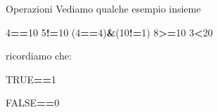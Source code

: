 \documentclass[
  ignorenonframetext,
]{beamer}
\newenvironment{Shaded}{\begin{snugshade}}{\end{snugshade}}
\newcommand{\DecValTok}[1]{\textcolor[rgb]{0.00,0.00,0.81}{#1}}
\newcommand{\NormalTok}[1]{#1}
\newcommand{\OperatorTok}[1]{\textcolor[rgb]{0.81,0.36,0.00}{\textbf{#1}}}
\newcommand{\OtherTok}[1]{\textcolor[rgb]{0.56,0.35,0.01}{#1}}
\begin{document}
\begin{frame}[fragile]{Operazioni}
\protect\hypertarget{operazioni-1}{}
Vediamo qualche esempio insieme

\begin{Shaded}
\begin{Highlighting}[]
\DecValTok{4}\OperatorTok{==}\DecValTok{10}
\DecValTok{5}\OperatorTok{!=}\DecValTok{10}
\NormalTok{(}\DecValTok{4}\OperatorTok{==}\DecValTok{4}\NormalTok{)}\OperatorTok{\&}\NormalTok{(}\DecValTok{10}\OperatorTok{!=}\DecValTok{1}\NormalTok{)}
\DecValTok{8}\OperatorTok{\textgreater{}=}\DecValTok{10}
\DecValTok{3}\OperatorTok{\textless{}}\DecValTok{20}
\end{Highlighting}
\end{Shaded}

ricordiamo che:

\begin{Shaded}
\begin{Highlighting}[]
\OtherTok{TRUE}\OperatorTok{==}\DecValTok{1}
\end{Highlighting}
\end{Shaded}

\begin{Shaded}
\begin{Highlighting}[]
\OtherTok{FALSE}\OperatorTok{==}\DecValTok{0}
\end{Highlighting}
\end{Shaded}
\end{frame}
\end{document}
